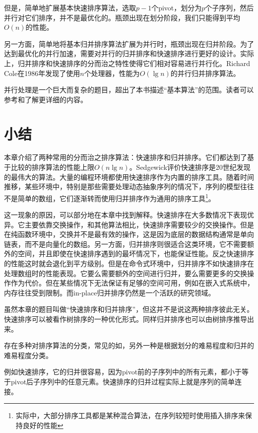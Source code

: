 \documentclass[UTF8]{article}
\begin{document}
但是，简单地扩展基本快速排序算法，选取$p-1$个pivot，划分为$p$个子序列，然后并行对它们排序，并不是最优化的。瓶颈出现在划分阶段，我们只能得到平均$O(n)$的性能。

另一方面，简单地将基本归并排序算法扩展为并行时，瓶颈出现在归并阶段。为了达到最优化的并行加速，需要对并行的归并排序和快速排序进行更好的设计。实际上，归并排序和快速排序的分而治之特性使得它们相对容易进行并行化。Richard Cole在1986年发现了使用$n$个处理器，性能为$O(\lg n)$的并行归并排序算法\cite{para-msort}。

并行处理是一个巨大而复杂的题目，超出了本书描述“基本算法”的范围。读者可以参考\cite{para-msort}和\cite{para-qsort}了解更详细的内容。

\section{小结}

本章介绍了两种常用的分而治之排序算法：快速排序和归并排序。它们都达到了基于比较的排序算法的性能上限$O(n \lg n)$。Sedgewick评价快速排序是20世纪发现的最伟大的算法。大量的编程环境都使用快速排序作为内置的排序工具。随着时间推移，某些环境中，特别是那些需要处理动态抽象序列的情况下，序列的模型往往不是简单的数组，它们逐渐转而使用归并排序作为通用的排序工具\footnote{实际中，大部分排序工具都是某种混合算法，在序列较短时使用插入排序来保持良好的性能}。

这一现象的原因，可以部分地在本章中找到解释。快速排序在大多数情况下表现优异。它主要依靠交换操作，和其他算法相比，快速排序需要较少的交换操作。但是在纯函数环境中，交换并不是最有效的操作，这是因为底层的数据结构通常是单向链表，而不是向量化的数组。另一方面，归并排序则很适合这类环境，它不需要额外的空间，并且即使在快速排序遇到的最坏情况下，也能保证性能。反之快速排序的性能这时就会退化到平方级别。但是在命令式环境中，归并排序不如快速排序在处理数组时的性能表现。它要么需要额外的空间进行归并，要么需要更多的交换操作作为代价。但在某些情况下无法保证有足够的空间可用，例如在嵌入式系统中，内存往往受到限制。而in-place归并排序仍然是一个活跃的研究领域。

虽然本章的题目叫做“快速排序和归并排序”，但这并不是说这两种排序彼此无关。快速排序可以被看作树排序的一种优化形式。同样归并排序也可以由树排序推导出来\cite{sort-deriving}。

存在多种对排序算法的分类，常见的如\cite{TAOCP}，另外一种是根据划分的难易程度和归并的难易程度分类\cite{algo-fp}。

例如快速排序，它的归并很容易，因为pivot前的子序列中的所有元素，都小于等于pivot后子序列中的任意元素。快速排序的归并过程实际上就是序列的简单连接。
\end{document}
